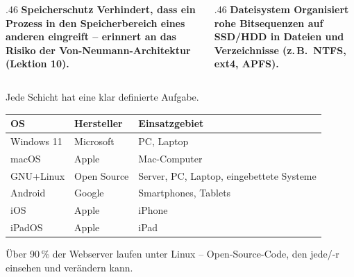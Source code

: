 \begin{frame}
\begin{columns}[T,onlytextwidth]
\begin{column}{.46\textwidth}
\large\bfseries\color{FDUteal}Speicherschutz
\vspace{2mm}
\normalsize Verhindert, dass ein Prozess in den Speicherbereich eines anderen eingreift -- erinnert an das Risiko der Von-Neumann-Architektur (Lektion 10).
\end{column}
\begin{column}{.46\textwidth}
\large\bfseries\color{FDUblue}Dateisystem
\vspace{2mm}
\normalsize Organisiert rohe Bitsequenzen auf SSD/HDD in Dateien und Verzeichnisse (z.\,B.\ NTFS, ext4, APFS).
\end{column}
\end{columns}
\end{frame}
% 
\begin{frame}
\begin{center}

\end{center}
\end{frame}
% 
\begin{frame}
\begin{center}

\end{center}
\begin{center}Jede Schicht hat eine klar definierte Aufgabe.\end{center}
\end{frame}
% 
\begin{frame}
\begin{table}[H]
    \centering
    \begin{tabular}{lll}
        \textbf{OS} & \textbf{Hersteller} & \textbf{Einsatzgebiet} \\\midrule
        Windows 11 & Microsoft & PC, Laptop \\
        macOS & Apple & Mac-Computer \\
        GNU+Linux & Open Source & Server, PC, Laptop, eingebettete Systeme \\
        Android & Google & Smartphones, Tablets \\
        iOS & Apple & iPhone \\
        iPadOS & Apple & iPad \\
    \end{tabular}
\end{table}
\begin{center}Über 90\,\% der Webserver laufen unter Linux -- Open-Source-Code, den jede/-r einsehen und verändern kann.\end{center}
\end{frame}
